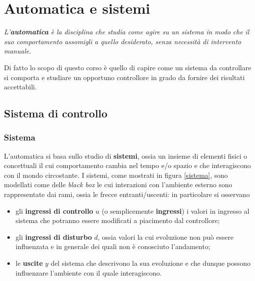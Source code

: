 \chapter{Automatica e sistemi}

	\begin{concetto}
		\textit{L'\textbf{automatica} è la disciplina che studia come agire su un sistema in modo che il suo comportamento assomigli a quello desiderato, senza necessità  di intervento manuale}.
	\end{concetto}
	Di fatto lo scopo di questo corso è quello di capire come un sistema da controllare si comporta e studiare un opportuno controllore in grado da fornire dei risultati accettabili.
	
\section{Sistema di controllo}
	\subsection{Sistema}
	
		\begin{concetto}
			L'automatica si basa sullo studio di \textbf{sistemi}, ossia un insieme di elementi fisici o concettuali il cui comportamento cambia nel tempo e/o spazio e che interagiscono con il mondo circostante. I sistemi, come mostrati in figura \ref{sistema}, sono modellati come delle \textit{black box} le cui interazioni con l'ambiente esterno sono rappresentate dai rami, ossia le frecce entranti/uscenti: in particolare si osservano
			\begin{itemize}
			    \item gli \textbf{ingressi di controllo}  $u$ (o semplicemente \textbf{ingressi}) i valori in ingresso al sistema che potranno essere modificati a piacimento dal controllore;
			    \item gli \textbf{ingressi di disturbo} $d$, ossia valori la cui evoluzione non può essere influenzata e in generale dei quali non è conosciuto l'andamento;
			    \item le \textbf{uscite} $y$ del sistema che descrivono la sua evoluzione e che dunque possono influenzare l'ambiente con il quale interagiscono.
			\end{itemize}
		\end{concetto}

    	
